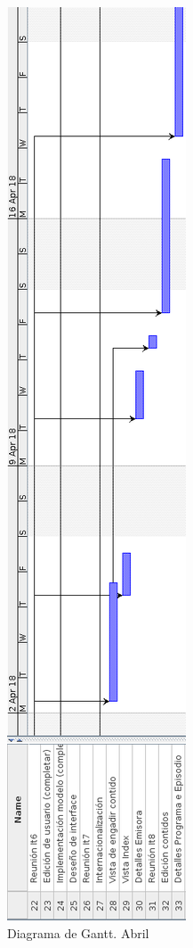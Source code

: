 \begin{figure}[H]
	\centering
	\includegraphics[scale=0.45,keepaspectratio=true]{./images/gantt/g8.png}
	\caption{Diagrama de Gantt. Abril}
\end{figure}

